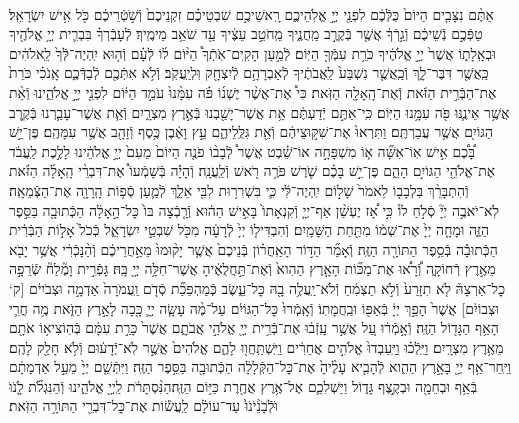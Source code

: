 \documentclass[twoside, openany, parskip=half, 11pt]{book}
\begin{document}
\begin{footnotesize}
\begin{multicols}{2}
\\
אַתֶּ֨ם נִצָּבִ֤ים הַיּוֹם֙ כֻּלְּֿכֶ֔ם לִפְנֵ֖י יְיָ֣ אֱלֹֽהֵיכֶ֑ם רָֽאשֵׁיכֶ֣ם שִׁבְטֵיכֶ֗ם זִקְנֵיכֶם֙ וְֿשֹׁ֣טְֿרֵיכֶ֔ם כֹּ֖ל אִ֥ישׁ יִשְׂרָאֵֽל׃ טַפְּֿכֶ֣ם נְֿשֵׁיכֶ֔ם וְֿגֵ֣רְֿךָ֔ אֲשֶׁ֖ר בְּֿקֶרֶ֣ב מַֽחֲנֶ֑יךָ מֵֽחֹטֵ֣ב עֵצֶ֔יךָ עַ֖ד שֹׁאֵ֥ב מֵימֶֽיךָ׃ לְֿעָבְֿרְךָ֗ בִּבְרִ֛ית יְיָ֥ אֱלֹהֶ֖יךָ וּבְאָֽלָת֑וֹ אֲשֶׁר֙ יְיָ֣ אֱלֹהֶ֔יךָ כֹּרֵ֥ת עִמְּֿךָ֖ הַיּֽוֹם׃
לְֿמַ֣עַן הָקִֽים־אֹֽתְֿךָ֩ הַיּ֨וֹם ל֜וֹ לְֿעָ֗ם וְֿה֤וּא יִֽהְיֶה־לְּֿךָ֙ לֵֽאלֹהִ֔ים כַּֽאֲשֶׁ֖ר דִּבֶּר־לָ֑ךְ וְֿכַֽאֲשֶׁ֤ר נִשְׁבַּע֙ לַֽאֲבֹתֶ֔יךָ לְֿאַבְרָהָ֥ם לְֿיִצְחָ֖ק וּֽלְיַֽעֲקֹֽב׃ וְֿלֹ֥א אִתְּֿכֶ֖ם לְֿבַדְּֿכֶ֑ם אָֽנֹכִ֗י כֹּרֵת֙ אֶת־הַבְּֿרִ֣ית הַזֹּ֔את וְֿאֶת־הָֽאָלָ֖ה הַזֹּֽאת׃ כִּי֩ אֶת־אֲשֶׁ֨ר יֶשְׁנ֜וֹ פֹּ֗ה עִמָּ֨נוּ֙ עֹמֵ֣ד הַיּ֔וֹם לִפְנֵ֖י יְיָ֣ אֱלֹהֵ֑ינוּ וְֿאֵ֨ת אֲשֶׁ֥ר אֵינֶ֛נּוּ פֹּ֖ה עִמָּ֥נוּ הַיּֽוֹם׃
כִּֽי־אַתֶּ֣ם יְֿדַעְתֶּ֔ם אֵ֥ת אֲשֶׁר־יָשַׁ֖בְנוּ בְּֿאֶ֣רֶץ מִצְרָ֑יִם וְֿאֵ֧ת אֲשֶׁר־עָבַ֛רְנוּ בְּֿקֶ֥רֶב הַגּוֹיִ֖ם אֲשֶׁ֥ר עֲבַרְתֶּֽם׃ וַתִּרְאוּ֙ אֶת־שִׁקּ֣וּצֵיהֶ֔ם וְֿאֵ֖ת גִּלֻּֽלֵיהֶ֑ם עֵ֣ץ וָאֶ֔בֶן כֶּ֥סֶף וְֿזָהָ֖ב אֲשֶׁ֥ר עִמָּהֶֽם׃ פֶּן־יֵ֣שׁ בָּ֠כֶ֠ם אִ֣ישׁ אֽוֹ־אִשָּׁ֞ה א֧וֹ מִשְׁפָּחָ֣ה אוֹ־שֵׁ֗בֶט אֲשֶׁר֩ לְֿבָב֨וֹ פֹנֶ֤ה הַיּוֹם֙ מֵעִם֙ יְיָ֣ אֱלֹהֵ֔ינוּ לָלֶ֣כֶת לַֽעֲבֹ֔ד אֶת־אֱלֹהֵ֖י הַגּוֹיִ֣ם הָהֵ֑ם פֶּן־יֵ֣שׁ בָּכֶ֗ם שֹׁ֛רֶשׁ פֹּרֶ֥ה רֹ֖אשׁ וְֿלַֽעֲנָֽה׃ וְֿהָיָ֡ה בְּֿשָׁמְֿעוֹ֩ אֶת־דִּבְרֵ֨י הָֽאָלָ֜ה הַזֹּ֗את וְֿהִתְבָּרֵ֨ךְ בִּלְבָב֤וֹ לֵאמֹר֙ שָׁל֣וֹם יִֽהְיֶה־לִּ֔י כִּ֛י בִּשְׁרִר֥וּת לִבִּ֖י אֵלֵ֑ךְ לְֿמַ֛עַן סְֿפ֥וֹת הָֽרָוָ֖ה אֶת־הַצְּֿמֵאָֽה׃ לֹֽא־יֹאבֶ֣ה יְיָ֘ סְֿלֹ֣חַ לוֹ֒ כִּ֣י אָ֠ז יֶעְשַׁ֨ן אַף־יְיָ֤ וְֿקִנְאָתוֹ֙ בָּאִ֣ישׁ הַה֔וּא וְֿרָ֤בְֿצָה בּוֹ֙ כׇּל־הָ֣אָלָ֔ה הַכְּֿתוּבָ֖ה בַּסֵּ֣פֶר הַזֶּ֑ה וּמָחָ֤ה יְיָ֙ אֶת־שְׁמ֔וֹ מִתַּ֖חַת הַשָּׁמָֽיִם׃ וְֿהִבְדִּיל֤וֹ יְיָ֙ לְֿרָעָ֔ה מִכֹּ֖ל שִׁבְטֵ֣י יִשְׂרָאֵ֑ל כְּֿכֹל֙ אָל֣וֹת הַבְּֿרִ֔ית הַכְּֿתוּבָ֕ה בְּֿסֵ֥פֶר הַתּוֹרָ֖ה הַזֶּֽה׃ וְֿאָמַ֞ר הַדּ֣וֹר הָאַֽחֲר֗וֹן בְּֿנֵיכֶם֙ אֲשֶׁ֤ר יָק֨וּמוּ֙ מֵאַ֣חֲרֵיכֶ֔ם וְֿהַ֨נָּכְֿרִ֔י אֲשֶׁ֥ר יָבֹ֖א מֵאֶ֣רֶץ רְֿחוֹקָ֑ה וְֿ֠רָא֠וּ אֶת־מַכּ֞וֹת הָאָ֤רֶץ הַהִוא֙ וְֿאֶת־תַּ֣חֲלֻאֶ֔יהָ אֲשֶׁר־חִלָּ֥ה יְיָ֖ בָּֽהּ׃ גָּפְֿרִ֣ית וָמֶ֘לַח֘ שְֿׂרֵפָ֣ה כׇל־אַרְצָהּ֒ לֹ֤א תִזָּרַע֙ וְֿלֹ֣א תַצְמִ֔חַ וְֿלֹא־יַֽעֲלֶ֥ה בָ֖הּ כׇּל־עֵ֑שֶׂב כְּֽֿמַהְפֵּכַ֞ת סְֿדֹ֤ם וַֽעֲמֹרָה֙ אַדְמָ֣ה וּצְבֹיִי֔ם [ק‘ וּצְבוֹיִ֔ם] אֲשֶׁר֙ הָפַ֣ךְ יְיָ֔ בְּֿאַפּ֖וֹ וּבַֽחֲמָתֽוֹ׃ וְֿאָֽמְֿרוּ֙ כׇּל־הַגּוֹיִ֔ם עַל־מֶ֨ה עָשָׂ֧ה יְיָ֛ כָּ֖כָה לָאָ֣רֶץ הַזֹּ֑את מֶ֥ה חֳרִ֛י הָאַ֥ף הַגָּד֖וֹל הַזֶּֽה׃ וְֿאָ֣מְֿר֔וּ עַ֚ל אֲשֶׁ֣ר עָֽזְֿב֔וּ אֶת־בְּֿרִ֥ית יְיָ֖ אֱלֹהֵ֣י אֲבֹתָ֑ם אֲשֶׁר֙ כָּרַ֣ת עִמָּ֔ם בְּֿהֽוֹצִיא֥וֹ אֹתָ֖ם מֵאֶ֥רֶץ מִצְרָֽיִם׃ וַיֵּֽלְֿכ֗וּ וַיַּֽעַבְדוּ֙ אֱלֹהִ֣ים אֲחֵרִ֔ים וַיִּֽשְׁתַּֽחֲו֖וּ לָהֶ֑ם אֱלֹהִים֙ אֲשֶׁ֣ר לֹֽא־יְֿדָע֔וּם וְֿלֹ֥א חָלַ֖ק לָהֶֽם׃ וַיִּֽחַר־אַ֥ף יְיָ֖ בָּאָ֣רֶץ הַהִ֑וא לְֿהָבִ֤יא עָלֶ֨יהָ֙ אֶת־כׇּל־הַקְּֿלָלָ֔ה הַכְּֿתוּבָ֖ה בַּסֵּ֥פֶר הַזֶּֽה׃ וַיִּתְּֿשֵׁ֤ם יְיָ֙ מֵעַ֣ל אַדְמָתָ֔ם בְּֿאַ֥ף וּבְחֵמָ֖ה וּבְקֶ֣צֶף גָּד֑וֹל וַיַּשְׁלִכֵ֛ם אֶל־אֶ֥רֶץ אֲחֶ֖רֶת כַּיּ֥וֹם הַזֶּֽה׃הַנִּ֨סְתָּרֹ֔ת לַֽיְיָ֖ אֱלֹהֵ֑ינוּ וְֿהַנִּגְלֹ֞ת לָֹ֤נֹוֹּ וֹּלְֹֿבָֹנֵֹ֨יֹנֹוֹּ֙ עַד־עוֹלָ֔ם לַֽעֲשׂ֕וֹת אֶת־כׇּל־דִּבְרֵ֖י הַתּוֹרָ֥ה הַזֹּֽאת׃


\end{multicols}
\end{footnotesize}
\end{document}
